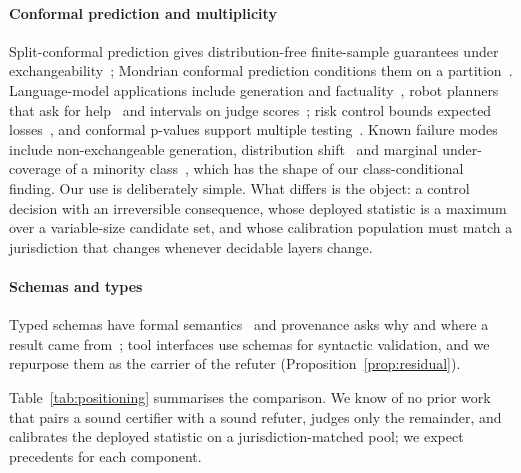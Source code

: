 \paragraph{Conformal prediction and multiplicity}
Split-conformal prediction gives distribution-free finite-sample guarantees under exchangeability~\cite{vovk2005alrw,lei2018distribution,angelopoulos2023gentle}; Mondrian conformal prediction conditions them on a partition~\cite{vovk2005alrw}. Language-model applications include generation and factuality~\cite{quach2023clm,mohri2024factuality}, robot planners that ask for help~\cite{ren2023knowno} and intervals on judge scores~\cite{sheng2025judgeconformal}; risk control bounds expected losses~\cite{angelopoulos2024crc,angelopoulos2021ltt}, and conformal p-values support multiple testing~\cite{bates2023outliers}. Known failure modes include non-exchangeable generation, distribution shift~\cite{ulmer2024nonexchangeable,lin2025domainshift} and marginal under-coverage of a minority class~\cite{tursunbadalov2026minority}, which has the shape of our class-conditional finding. Our use is deliberately simple. What differs is the object: a control decision with an irreversible consequence, whose deployed statistic is a maximum over a variable-size candidate set, and whose calibration population must match a jurisdiction that changes whenever decidable layers change.

\paragraph{Schemas and types}
Typed schemas have formal semantics~\cite{pezoa2016jsonschema} and provenance asks why and where a result came from~\cite{buneman2001provenance}; tool interfaces use schemas for syntactic validation, and we repurpose them as the carrier of the refuter (Proposition~\ref{prop:residual}).

Table~\ref{tab:positioning} summarises the comparison. We know of no prior work that pairs a sound certifier with a sound refuter, judges only the remainder, and calibrates the deployed statistic on a jurisdiction-matched pool; we expect precedents for each component.

